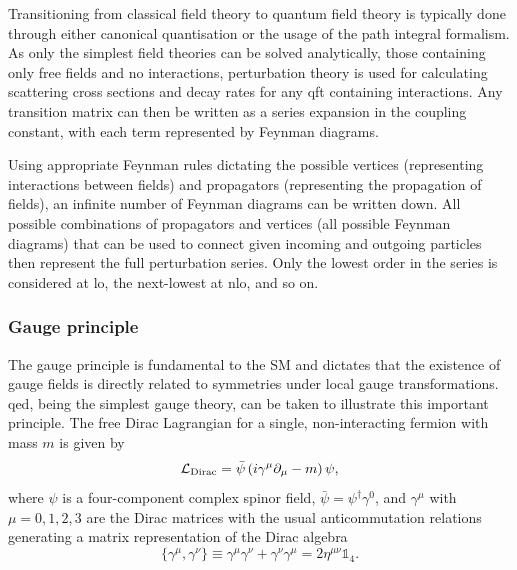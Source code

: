 Transitioning from classical field theory to quantum field theory is typically done through either canonical quantisation or the usage of the path integral formalism. As only the simplest field theories can be solved analytically, \ie those containing only free fields and no interactions, perturbation theory is used for calculating scattering cross sections and decay rates for any \gls{qft} containing interactions. Any transition matrix can then be written as a series expansion in the coupling constant, with each term represented by Feynman diagrams. 

Using appropriate Feynman rules dictating the possible vertices (representing interactions between fields) and propagators (representing the propagation of fields), an infinite number of Feynman diagrams can be written down. All possible combinations of propagators and vertices (\ie all possible Feynman diagrams) that can be used to connect given incoming and outgoing particles then represent the full perturbation series. Only the lowest order in the series is considered at \gls{lo}, the next-lowest at \gls{nlo}, and so on.


\subsubsection{Gauge principle}
\label{sec:gauge_principle}

The gauge principle is fundamental to the SM and dictates that the existence of gauge fields is directly related to symmetries under local gauge transformations. \gls{qed}, being the simplest gauge theory, can be taken to illustrate this important principle. The free Dirac Lagrangian for a single, non-interacting fermion with mass $m$ is given by
\begin{equation}
	\mathcal{L}_\mathrm{Dirac}=\bar{\psi}\left(i\gamma^\mu\partial_\mu - m\right)\psi,
	\label{eq:dirac_lagrangian}
\end{equation}
where $\psi$ is a four-component complex spinor field, $\bar{\psi} = \psi^\dagger\gamma^0$, and $\gamma^\mu$ with $\mu = 0,1,2,3 $ are the Dirac matrices with the usual anticommutation relations generating a matrix representation of the Dirac algebra 
\begin{equation}
	\{\gamma^\mu,\gamma^\nu\} \equiv \gamma^\mu\gamma^\nu + \gamma^\nu\gamma^\mu = 2\eta^{\mu\nu}\mathbb{1}_4.
\end{equation}

